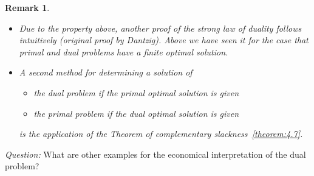 \documentclass[a4paper]{article}
\numberwithin{lecref}{section}
\newtheorem*{Remark}{Remark}
\begin{document}
\begin{Remark}
	\begin{itemize}
		\item
			Due to the property above, another proof of the strong law of duality follows intuitively (original proof by Dantzig).
			Above we have seen it for the case that primal and dual problems have a finite optimal solution.
		\item
			A second method for determining a solution of
			\begin{itemize}
				\item the dual problem if the primal optimal solution is given
				\item the primal problem if the dual optimal solution is given
			\end{itemize}
			is the application of the Theorem of complementary slackness~\ref{theorem:4.7}.
	\end{itemize}
\end{Remark}

\emph{Question:} What are other examples for the economical interpretation of the dual problem?
\end{document}
